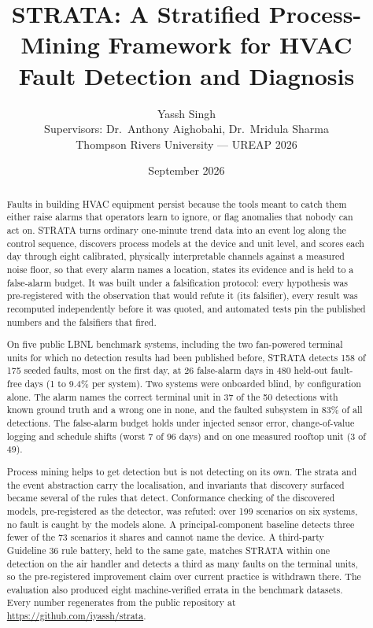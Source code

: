 \documentclass[11pt,letterpaper]{article}
\title{STRATA: A Stratified Process-Mining Framework for HVAC Fault Detection and Diagnosis}
\author{Yassh Singh \\
\small Supervisors: Dr.\ Anthony Aighobahi, Dr.\ Mridula Sharma \\
\small Thompson Rivers University --- UREAP 2026}
\date{September 2026}
\begin{document}
\maketitle

\begin{abstract}
\noindent
Faults in building HVAC equipment persist because the tools meant to catch them either raise alarms that operators learn to ignore, or flag anomalies that nobody can act on. STRATA turns ordinary one-minute trend data into an event log along the control sequence, discovers process models at the device and unit level, and scores each day through eight calibrated, physically interpretable channels against a measured noise floor, so that every alarm names a location, states its evidence and is held to a false-alarm budget. It was built under a falsification protocol: every hypothesis was pre-registered with the observation that would refute it (its falsifier), every result was recomputed independently before it was quoted, and automated tests pin the published numbers and the falsifiers that fired.

On five public LBNL benchmark systems, including the two fan-powered terminal units for which no detection results had been published before, STRATA detects 158 of 175 seeded faults, most on the first day, at 26 false-alarm days in 480 held-out fault-free days (1 to 9.4\% per system). Two systems were onboarded blind, by configuration alone. The alarm names the correct terminal unit in 37 of the 50 detections with known ground truth and a wrong one in none, and the faulted subsystem in 83\% of all detections. The false-alarm budget holds under injected sensor error, change-of-value logging and schedule shifts (worst 7 of 96 days) and on one measured rooftop unit (3 of 49).

Process mining helps to get detection but is not detecting on its own. The strata and the event abstraction carry the localisation, and invariants that discovery surfaced became several of the rules that detect. Conformance checking of the discovered models, pre-registered as the detector, was refuted: over 199 scenarios on six systems, no fault is caught by the models alone. A principal-component baseline detects three fewer of the 73 scenarios it shares and cannot name the device. A third-party Guideline 36 rule battery, held to the same gate, matches STRATA within one detection on the air handler and detects a third as many faults on the terminal units, so the pre-registered improvement claim over current practice is withdrawn there. The evaluation also produced eight machine-verified errata in the benchmark datasets. Every number regenerates from the public repository at \url{https://github.com/iyassh/strata}.
\end{abstract}
\end{document}
